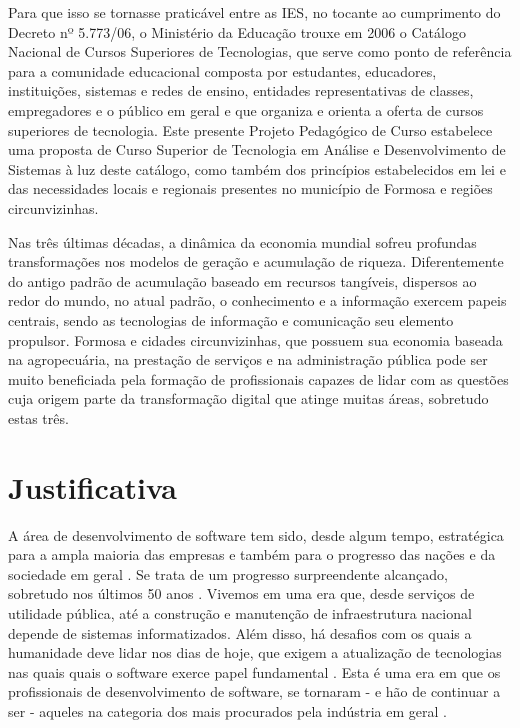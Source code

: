 \documentclass[11pt,fleqn]{book} %
\begin{document}
Para que isso se tornasse praticável entre as IES, no tocante ao cumprimento do Decreto nº 5.773/06, o Ministério da Educação trouxe em 2006 o Catálogo Nacional de Cursos Superiores de Tecnologias, que serve como ponto de referência para a comunidade educacional composta por estudantes, educadores, instituições, sistemas e redes de ensino, entidades representativas de classes, empregadores e o público em geral e que  organiza e orienta a oferta de cursos superiores de tecnologia. Este presente Projeto Pedagógico de Curso estabelece uma proposta de Curso Superior de Tecnologia em Análise e Desenvolvimento de Sistemas à luz deste catálogo, como também dos princípios estabelecidos em lei e das necessidades locais e regionais presentes no município de Formosa e regiões circunvizinhas.

Nas três últimas décadas, a dinâmica da economia mundial sofreu profundas transformações nos modelos de geração e acumulação de riqueza. Diferentemente do antigo padrão de acumulação baseado
em recursos tangíveis, dispersos ao redor do mundo, no atual padrão, o conhecimento e a informação exercem papeis centrais, sendo as tecnologias de informação e comunicação seu elemento propulsor. Formosa e cidades circunvizinhas, que possuem sua economia baseada na agropecuária, na prestação de serviços e na administração pública pode ser muito beneficiada pela formação de profissionais capazes de lidar com as questões cuja origem parte da transformação digital que atinge muitas áreas, sobretudo estas três.

\section{Justificativa}

A área de desenvolvimento de software tem sido, desde algum tempo, estratégica para a ampla maioria das empresas e também para o progresso das nações e da sociedade em geral \cite{sommerville2019engenharia}. Se trata de um progresso surpreendente alcançado, sobretudo nos últimos 50 anos  \cite{sommerville2019engenharia}. Vivemos em uma era que, desde serviços de utilidade pública, até a construção e manutenção de infraestrutura nacional depende de sistemas informatizados. Além disso, há desafios com os quais a humanidade deve lidar nos dias de hoje, que exigem a atualização de tecnologias nas quais quais o software exerce papel fundamental \cite{sommerville2019engenharia}. Esta é uma era em que os profissionais de desenvolvimento de software, se tornaram - e hão de continuar a ser - aqueles na categoria dos mais procurados pela indústria em geral \cite{pressman2016engenharia}.
\end{document}
